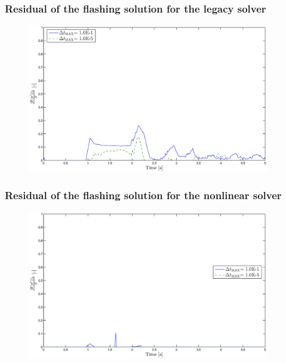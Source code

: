 \documentclass[compress,xcolor=table]{beamer}
\begin{document}
\begin{frame}
\frametitle{Residual of the flashing solution for the legacy solver}

\begin{figure}[h!t]
\centering
\includegraphics[width=0.94\textwidth]{images/cobra_flashing_res_compare.eps}
\end{figure}

\end{frame}
\begin{frame}
\frametitle{Residual of the flashing solution for the nonlinear solver}

\begin{figure}[h!t]
\centering
\includegraphics[width=0.94\textwidth]{images/nl_flashing_res_compare.eps}
\end{figure}

\end{frame}
\end{document}
